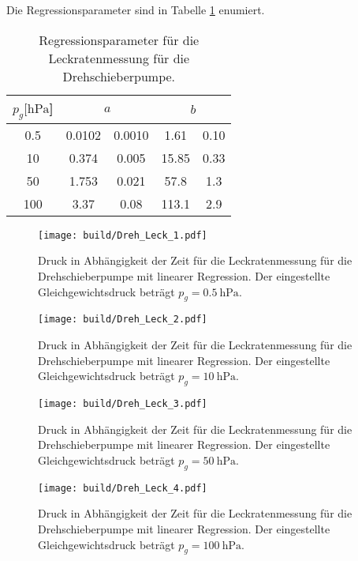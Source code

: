 Die Regressionsparameter sind in Tabelle \ref{tab:Dreh_Leck_para} enumiert.
\begin{table}[H]
  \centering
    \caption{Regressionsparameter für die Leckratenmessung für die Drehschieberpumpe.}
    \label{tab:Dreh_Leck_para}
    \begin{tabular}{c c @{${}\pm{}$} c c @{${}\pm{}$} c}
      \toprule
      {$p_g [\si{\hecto\pascal}$]} & \multicolumn{2}{c}{$a$} & \multicolumn{2}{c}{$b$} \\
      \midrule
      0.5 & 0.0102 & 0.0010 & 1.61  & 0.10\\
      10  & 0.374  & 0.005  & 15.85 & 0.33\\
      50  & 1.753  & 0.021  & 57.8  & 1.3\\
      100 & 3.37   & 0.08   & 113.1 & 2.9\\
      \bottomrule
    \end{tabular}
\end{table}
\begin{figure}
    \centering
    \texttt{[image: build/Dreh\_Leck\_1.pdf]}
    \caption{Druck in Abhängigkeit der Zeit für die Leckratenmessung für die Drehschieberpumpe mit linearer Regression. Der eingestellte Gleichgewichtsdruck beträgt $p_g=\SI{0.5}{\hecto\pascal}$.}
    \label{fig:dreh_leck1}
\end{figure}
\begin{figure}
    \centering
    \texttt{[image: build/Dreh\_Leck\_2.pdf]}
    \caption{Druck in Abhängigkeit der Zeit für die Leckratenmessung für die Drehschieberpumpe mit linearer Regression. Der eingestellte Gleichgewichtsdruck beträgt $p_g=\SI{10}{\hecto\pascal}$.}
    \label{fig:dreh_leck2}
\end{figure}
\begin{figure}
    \centering
    \texttt{[image: build/Dreh\_Leck\_3.pdf]}
    \caption{Druck in Abhängigkeit der Zeit für die Leckratenmessung für die Drehschieberpumpe mit linearer Regression. Der eingestellte Gleichgewichtsdruck beträgt $p_g=\SI{50}{\hecto\pascal}$.}
    \label{fig:dreh_leck3}
\end{figure}
\begin{figure}
    \centering
    \texttt{[image: build/Dreh\_Leck\_4.pdf]}
    \caption{Druck in Abhängigkeit der Zeit für die Leckratenmessung für die Drehschieberpumpe mit linearer Regression. Der eingestellte Gleichgewichtsdruck beträgt $p_g=\SI{100}{\hecto\pascal}$.}
    \label{fig:dreh_leck4}
\end{figure}
